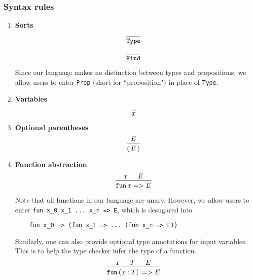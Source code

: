 \documentclass{article}
\begin{document}

\subsubsection{Syntax rules}
\begin{enumerate}
\item \textbf{Sorts} \\
  \[
    \begin{prooftree}
      \infer0{\Type}
    \end{prooftree}
  \]

  \[
    \begin{prooftree}
      \infer0{\Kind}
    \end{prooftree}
  \]

  Since our language makes no distinction between types and propositions,
  we allow users to enter \verb|Prop| (short for ``proposition") in place of 
  \verb|Type|.

\item \textbf{Variables} \\
  \[
    \begin{prooftree}
      \infer0{x}
    \end{prooftree}
  \]

\item \textbf{Optional parentheses} \\
  \[
    \begin{prooftree}
      \hypo{E}
      \infer1{( \, E \, )}
    \end{prooftree}
  \]
  
\item \textbf{Function abstraction} \\
  \[
    \begin{prooftree}
      \hypo{x}
      \hypo{E}
      \infer2{\fun \, x => E}
    \end{prooftree}
  \]

  Note that all functions in our language are unary. However, we allow users
  to enter \verb|fun x_0 x_1 ... x_n => E|, which is desugared into
  \begin{verbatim}
    fun x_0 => (fun x_1 => ... (fun x_n => E))
  \end{verbatim}

  Similarly, one can also provide optional type annotations for input variables.
  This is to help the type checker infer the type of a function.
  \[
    \begin{prooftree}
      \hypo{x}
      \hypo{T}
      \hypo{E}
      \infer3{\fun \, (x : T) \, => E}
    \end{prooftree}
  \]


\end{enumerate}
\end{document}
